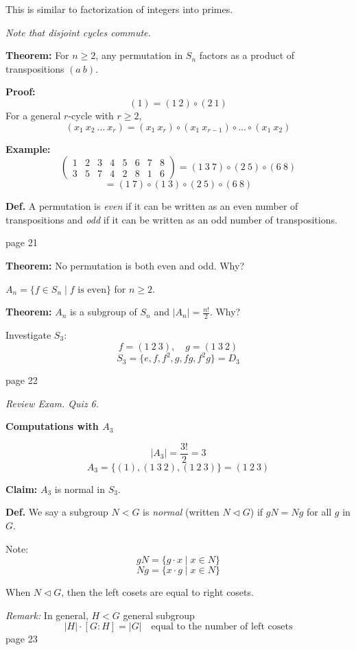 \documentclass{article}
\begin{document}
This is similar to factorization of integers into primes.

\textit{Note that disjoint cycles commute.}

\textbf{Theorem:} For $n \geq 2$, any permutation in $S_n$ factors as a product of transpositions $(a \ b)$.

\textbf{Proof:}
\[
(1) = (1 \ 2) \circ (2 \ 1)
\]
For a general $r$-cycle with $r \geq 2$,
\[
(x_1 \ x_2 \ \ldots \ x_r) = (x_1 \ x_r) \circ (x_1 \ x_{r-1}) \circ \ldots \circ (x_1 \ x_2)
\]

\textbf{Example:}
\[
\begin{pmatrix}
1 & 2 & 3 & 4 & 5 & 6 & 7 & 8 \\
3 & 5 & 7 & 4 & 2 & 8 & 1 & 6
\end{pmatrix}
= (1 \ 3 \ 7) \circ (2 \ 5) \circ (6 \ 8)
\]
\[
= (1 \ 7) \circ (1 \ 3) \circ (2 \ 5) \circ (6 \ 8)
\]

\textbf{Def.} A permutation is \textit{even} if it can be written as an even number of transpositions and \textit{odd} if it can be written as an odd number of transpositions.

\newpage
\noindent page 21

\textbf{Theorem:} No permutation is both even and odd. Why? 

$A_n = \{ f \in S_n \mid f \text{ is even} \}$ for $n \geq 2$.

\textbf{Theorem:} $A_n$ is a subgroup of $S_n$ and $|A_n| = \frac{n!}{2}$. Why? 

Investigate $S_3$:
\[
f = (1 \ 2 \ 3), \quad g = (1 \ 3 \ 2)
\]
\[
S_3 = \{ e, f, f^2, g, fg, f^2g \} = D_3
\]

\newpage
\noindent page 22

\textit{Review Exam. Quiz 6.}

\textbf{Computations with $A_3$}

\[
|A_3| = \frac{3!}{2} = 3
\]
\[
A_3 = \{ (1), (1 \ 3 \ 2), (1 \ 2 \ 3) \} = (1 \ 2 \ 3)
\]

\textbf{Claim:} $A_3$ is normal in $S_3$.

\textbf{Def.} We say a subgroup $N < G$ is \textit{normal} (written $N \triangleleft G$) if $gN = Ng$ for all $g$ in $G$.

Note: 
\[
gN = \{ g \cdot x \mid x \in N \}
\]
\[
Ng = \{ x \cdot g \mid x \in N \}
\]

When $N \triangleleft G$, then the left cosets are equal to right cosets.

\textit{Remark:} In general, $H < G$ general subgroup
\[
|H| \cdot [G : H] = |G| \quad \text{equal to the number of left cosets}
\]
\newpage
\noindent page 23
\end{document}
